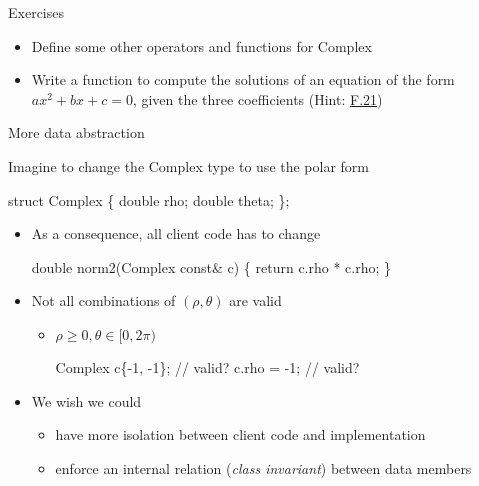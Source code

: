 \begin{frame}[fragile]{Exercises}
  \begin{itemize}
  \item Define some other operators and functions for Complex
  \item Write a function to compute the solutions of an equation of the form
    $ax^2 + bx + c = 0$, given the three coefficients (Hint:
    \href{https://isocpp.github.io/CppCoreGuidelines/CppCoreGuidelines#f21-to-return-multiple-out-values-prefer-returning-a-struct-or-tuple}{F.21})
  \end{itemize}
\end{frame}

\begin{frame}[fragile]{More data abstraction}

  Imagine to change the Complex type to use the polar form

  \begin{codeblock}
struct Complex \{
  double rho;
  double theta;
\};\end{codeblock}

  \begin{itemize}
  \item<2-> As a consequence, all client code has to change
    \begin{codeblock}
double norm2(Complex const& c) \{ return c.rho * c.rho; \}\end{codeblock}
  \item<3-> Not all combinations of $(\rho,\theta)$ are valid
    \begin{itemize}
    \item $\rho \geq 0, \theta \in [0, 2\pi)$
      \begin{codeblock}
Complex c\{-1, -1\}; // valid?
c.rho = -1;        // valid?\end{codeblock}
    \end{itemize}
  \end{itemize}

  \begin{itemize}
  \item<4-> We wish we could
    \begin{itemize}
    \item have more isolation between client code and implementation
    \item enforce an internal relation (\textit{class invariant}) between data
      members
    \end{itemize}
  \end{itemize}

\end{frame}

